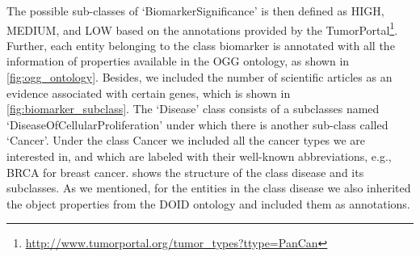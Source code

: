 \hspace*{3.5mm} The possible sub-classes of `BiomarkerSignificance' is then defined as HIGH, MEDIUM, and LOW based on the annotations provided by the TumorPortal\footnote{\url{http://www.tumorportal.org/tumor_types?ttype=PanCan}}. Further, each entity belonging to the class biomarker is annotated with all the information of properties available in the OGG ontology, as shown in \cref{fig:ogg_ontology}. Besides, we included the number of scientific articles as an evidence associated with certain genes, which is shown in \cref{fig:biomarker_subclass}. The `Disease' class consists of a subclasses named  `DiseaseOfCellularProliferation' under which there is another sub-class called `Cancer'. Under the class Cancer we included all the cancer types we are interested in, and which are labeled with their well-known abbreviations, e.g., BRCA for breast cancer.  shows the structure of the class disease and its subclasses. As we mentioned, for the entities in the class disease we also inherited the object properties from the DOID ontology and included them as annotations. 

